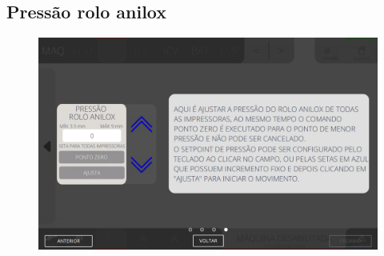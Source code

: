 \newpage
\thispagestyle{fancy}
\vspace*{40 pt}
\subsection{Pressão rolo anilox}
\vspace*{\fill}
\begin{figure}[h]
    \centering
    \includegraphics[width=576 px,height=360 px]{src/imagesICV/04-printters/01-printters/settings/13.png}
\end{figure}
\vspace*{\fill}